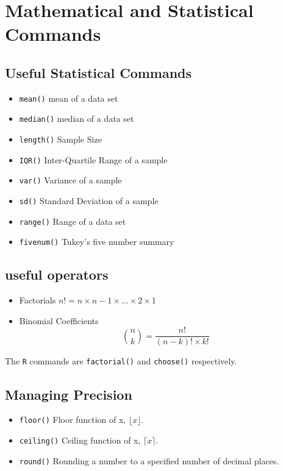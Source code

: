 \documentclass[a4paper,12pt]{article}
\begin{document}
\tableofcontents
\section{Mathematical and Statistical Commands}

\subsection{Useful Statistical Commands}
\begin{itemize}
	\item \texttt{mean()} mean of a data set
	\item \texttt{median()} median of a data set
	\item \texttt{length()} Sample Size
	\item \texttt{IQR()} Inter-Quartile Range of a sample
	\item \texttt{var()} Variance of a sample
	\item \texttt{sd()} Standard Deviation  of a sample
	\item \texttt{range()} Range of a data set
	\item \texttt{fivenum()} Tukey's five number summary
\end{itemize}

\subsection{useful operators}

\begin{itemize}
	\item Factorials
	$n! = n \times n-1 \times \ldots \times 2 \times 1 $
	\item Binomial Coefficients
	\[ { n \choose k }  = \frac{n!}{(n-k)! \times k!}\]
\end{itemize}
The \texttt{R} commands are \texttt{factorial()} and \texttt{choose()} respectively.
\subsection{Managing Precision}

\begin{itemize}
	\item \texttt{floor()} Floor function of x, $\lfloor x \rfloor$.
	\item \texttt{ceiling()} Ceiling function of x, $\lceil x \rceil$.
	\item \texttt{round()} Rounding a number to a specified number of decimal places.
\end{itemize}
\end{document}
